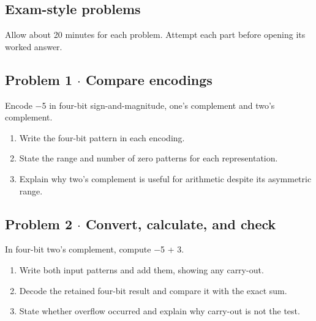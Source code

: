 \documentclass[11pt]{article}
\begin{document}
\begin{keepsection}
\section{Exam-style problems}

Allow about 20 minutes for each problem. Attempt each part before opening its worked answer.

\begin{keepsection}
\subsection{Problem 1 \ensuremath{\cdot} Compare encodings}

Encode \ensuremath{-}5 in four-bit sign-and-magnitude, one’s complement and two’s complement.

\begin{enumerate}
\item Write the four-bit pattern in each encoding.
\item State the range and number of zero patterns for each representation.
\item Explain why two’s complement is useful for arithmetic despite its asymmetric range.
\end{enumerate}

\end{keepsection}

\begin{keepsection}
\subsection{Problem 2 \ensuremath{\cdot} Convert, calculate, and check}

In four-bit two’s complement, compute \ensuremath{-}5 + 3.

\begin{enumerate}
\item Write both input patterns and add them, showing any carry-out.
\item Decode the retained four-bit result and compare it with the exact sum.
\item State whether overflow occurred and explain why carry-out is not the test.
\end{enumerate}


\end{keepsection}
\end{keepsection}
\end{document}
